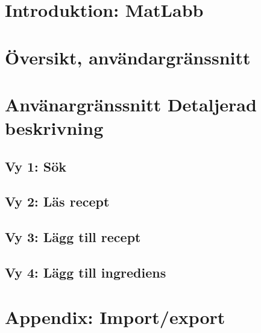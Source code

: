 
\chapter{Introduktion: MatLabb}


\chapter{Översikt, användargränssnitt}


\chapter{Använargränssnitt Detaljerad beskrivning}

  \section{Vy 1: Sök}
  
  \section{Vy 2: Läs recept}
  
  \section{Vy 3: Lägg till recept}
  
  \section{Vy 4: Lägg till ingrediens}\label{adding}
  
\appendix
\newpage
\chapter{Appendix: Import/export}\label{app:xml}
\texttt{\newpage}

